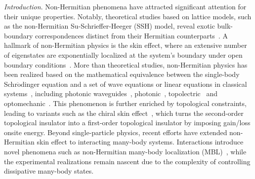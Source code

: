 \documentclass[longbibliography, aps, prx, amsmath, amssymb, amsfonts, twocolumn,superscriptaddress, footinbib]{revtex4-1}
\begin{document}
	\textit{Introduction}. Non-Hermitian phenomena have attracted significant attention for their unique properties. Notably, theoretical studies based on lattice models, such as the non-Hermitian Su-Schrieffer-Heeger (SSH) model, reveal exotic bulk-boundary correspondences distinct from their Hermitian counterparts~\cite{RN1166,RN1168}. 
	A hallmark of non-Hermitian physics is the skin effect, where an extensive number of eigenstates are exponentially localized at the system's boundary under open boundary conditions~\cite{gong2018topological,kawabata2019symmetry,RN1212,RN1214,RN1217,RN1160}. %
	More than theoretical studies, non-Hermitian physics has been realized based on the mathematical equivalence between the single-body Schr$\ddot{\mathrm{o}}$dinger equation and a set of wave equations or linear equations in classical systems~\cite{RN1161}, including photonic waveguides~\cite{nie2023non}, photonic~\cite{RN1165,RN1167,RN1227}, topolectric~\cite{zou2021observation,RN2,RN1225} and optomechanic~\cite{RN632,RN1226}. 
	This phenomenon is further enriched by topological constraints, leading to variants such as the chiral skin effect~\cite{nakamura2023universal, ma2024non,schindler2023hermitian,lee2019hybrid,RN1221}, which turns the second-order topological insulator into a first-order topological insulator by imposing gain/loss onsite energy. 
	Beyond single-particle physics, recent efforts have extended non-Hermitian skin effect to interacting many-body systems. %
	Interactions introduce novel phenomena such as non-Hermitian many-body localization (MBL)~\cite{mak2024statics,hamazaki2019non}, while the experimental realizations remain nascent due to the complexity of controlling dissipative many-body states.
\end{document}
